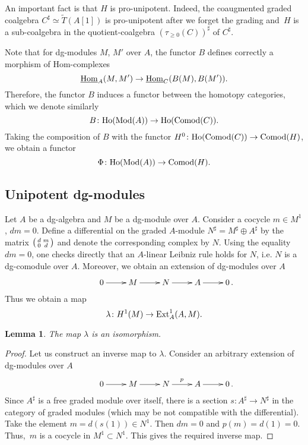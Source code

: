 \documentclass[10pt,russian]{article}
\theoremstyle{plain}
\newtheorem{lemma}[theorem]{Lemma}
\theoremstyle{definition}
\newcommand{\Hom}{{\rm Hom}}
\newcommand{\Mod}{{\rm Mod}}
\newcommand{\Comod}{{\rm Comod}}
\newcommand{\Ext}{{\rm Ext}}
\newcommand{\Ho}{{\rm Ho}}
\begin{document}
An important fact is that $H$ is pro-unipotent. Indeed, the coaugmented graded coalgebra $C^{\sharp}\simeq\widetilde{T}(A[1])$ is pro-unipotent after we forget the grading and~$H$ is a sub-coalgebra in the quotient-coalgebra $(\tau_{\geqslant 0}(C))^{\sharp}$ of $C^{\sharp}$.

Note that for dg-modules $M$, $M'$ over $A$, the functor $B$ defines correctly a morphism of Hom-complexes
$$
\underline{\Hom}_A(M,M')\to \underline{\Hom}_C(B(M),B(M')).
$$
Therefore, the functor $B$ induces a functor between the homotopy categories, which we denote similarly
$$
B\colon \Ho(\Mod(A))\to \Ho(\Comod(C)).
$$
Taking the composition of $B$ with the functor $H^0\colon \Ho(\Comod(C))\to \Comod(H)$, we obtain a functor
\begin{equation}\label{eq:Phi}
\Phi\colon \Ho(\Mod(A))\to \Comod(H).
\end{equation}


\subsection{Unipotent dg-modules}


Let $A$ be a dg-algebra and $M$ be a dg-module over $A$. Consider a cocycle $m \in M^1$, $dm=0$.
Define a differential on the graded $A$-module $N^{\sharp} =M^{\sharp} \oplus A^{\sharp}$ by the matrix $
\begin{psmallmatrix}
	d & m \\
	0 & d \\
\end{psmallmatrix}
$ and denote the corresponding complex by $N$. Using the equality $dm=0$, one checks directly that an $A$-linear Leibniz rule holds for $N$, i.e. $N$ is a dg-comodule over $A$. Moreover, we obtain an extension of dg-modules over $A$
$$
\xymatrix{
	& 0 \ar[r] &  M \ar[r] & N  \ar[r] &  A  \ar[r] & 0\,.
}
$$
Thus we obtain a map
\begin{equation}\label{eq:mu}
\lambda \colon H^1(M) \to \Ext_A^1(A, M).
\end{equation}


\begin{lemma}
\label{'useful3'}
The map $\lambda$ is an isomorphism.
\end{lemma}
\begin{proof}
	Let us construct an inverse map to $\lambda$. Consider an arbitrary extension of dg-modules over $A$
	$$
	\xymatrix{
		& 0 \ar[r] &  M \ar[r] & N  \ar[r]^{p} &  A  \ar[r] & 0\,.	
	}
	$$
	Since $A^{\sharp}$ is a free graded module over itself, there is a section $s\colon A^{\sharp}\to N^{\sharp}$ in the category of graded modules (which may be not compatible with the differential). Take the element ${m=d(s(1))\in N^1}$. Then $dm=0$ and $p(m) = d(1) = 0$. Thus,~$m$ is a cocycle in $M^1 \subset N^1$. This gives the required inverse map.
\end{proof}
\end{document}
